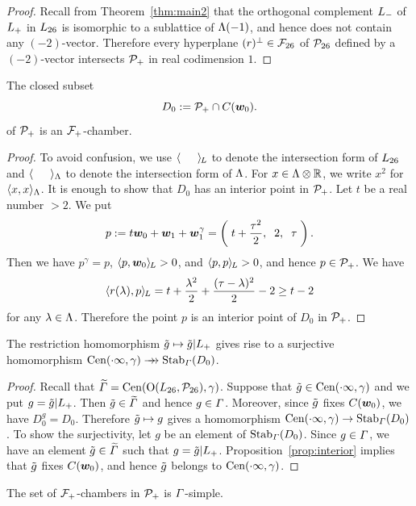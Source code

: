 \documentclass{amsart} %
\begin{document}
%
\begin{proof}
Recall from Theorem~\ref{thm:main2} that 
the orthogonal complement $L_{-}$
 of $L_{+}$ in $L_{26}$
is isomorphic to a sublattice of $\Lambda(-1)$,
and hence does not contain any $(-2)$-vector.
Therefore every hyperplane $(r)^{\perp}\in {\mathord{\mathcal{F}}}_{26}$ of $\mathord{\mathcal{P}}_{26}$ defined by a $(-2)$-vector 
intersects $\mathord{\mathcal{P}}_{+}$ in real codimension $1$.
\end{proof}
%
%
\begin{proposition}\label{prop:D0}
The closed subset 
\[
D_0:=\mathord{\mathcal{P}}_{+}\cap \mathord{C}(\boldsymbol{w}_0).
\]
of $\mathord{\mathcal{P}}_{+}$ is an $\mathord{\mathcal{F}}_{+}$-chamber.
\end{proposition}
%
\begin{proof}
To avoid confusion, we use $\langle \phantom{a, a} \rangle_{\hskip -1pt L}$ to denote the intersection form of $L_{26}$
and $\langle \phantom{a, a} \rangle_{\Lambda}$ to denote the intersection form of $\Lambda$.
For $x\in \Lambda\otimes\mathord{\mathbb{R}}$, we write $x^2$ for $\langle x,x \rangle_{\Lambda}$.
It is enough to show that $D_0$ has an interior point in $\mathord{\mathcal{P}}_{+}$.
Let $t$ be a real number $>2$.
We put
\[
p:=t\boldsymbol{w}_0+\boldsymbol{w}_1+\boldsymbol{w}_1^{\gamma}=\left(\; t+\frac{\tau^2}{2}, \;\;2, \;\; \tau\;\right).
\]
%
Then we have $p^{\gamma}=p$, $\langle p, \boldsymbol{w}_0 \rangle_{\hskip -1pt L}>0$, and $\langle p, p \rangle_{\hskip -1pt L}>0$,
and hence $p\in \mathord{\mathcal{P}}_{+}$.
We have 
\[
\langle r(\lambda), p \rangle_{\hskip -1pt L}=t+\frac{\lambda^2}{2}+\frac{(\tau-\lambda)^2}{2}-2\ge t-2
\]
for any $\lambda\in \Lambda$.
Therefore the point $p$ is an interior point of $D_0$ in $\mathord{\mathcal{P}}_{+}$.
\end{proof}
%
\begin{proposition}\label{prop:CenStab}
The restriction homomorphism
$\tilde{g}\mapsto \tilde{g}|L_{+}$
gives rise to a surjective homomorphism 
$\mathrm{Cen}(\cdot \infty, \gamma)\mathrel{\rightarrow\!\!\!\!\rightarrow} \operatorname{Stab}_{\varGamma}(D_0)$.
\end{proposition}
%
\begin{proof}
Recall that 
$\widetilde{\varGamma}=\mathrm{Cen}(\mathord{\mathrm{O}}(L_{26}, \mathord{\mathcal{P}}_{26}), \gamma)$.
Suppose that $\tilde{g}\in \mathrm{Cen}(\cdot \infty, \gamma)$
and we put $g=\tilde{g}|L_{+}$.
Then $\tilde{g}\in \widetilde{\varGamma}$ and hence $g\in \varGamma$.
Moreover, since $\tilde{g}$ fixes $\mathord{C}(\boldsymbol{w}_0)$,
we have $D_0^g=D_0$.
Therefore $\tilde{g}\mapsto g$ gives a homomorphism 
$\mathrm{Cen}(\cdot \infty, \gamma)\to\operatorname{Stab}_{\varGamma}(D_0)$.
To show the surjectivity,
let $g$ be an element of $\operatorname{Stab}_{\varGamma}(D_0)$.
Since $g\in \varGamma$,
we have an element $\tilde{g}\in \widetilde{\varGamma}$ such that $g=\tilde{g}|L_{+}$.
Proposition~\ref{prop:interior} implies that $\tilde{g}$ fixes $\mathord{C}(\boldsymbol{w}_0)$,
and hence $\tilde{g}$ belongs to $\mathrm{Cen}(\cdot \infty, \gamma)$.
\end{proof}
%
\begin{proposition}\label{prop:PhiSimple}
The set of $\mathord{\mathcal{F}}_{+}$-chambers in $\mathord{\mathcal{P}}_{+}$ is $\varGamma$-simple.
\end{proposition}
\end{document}

